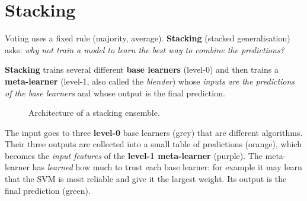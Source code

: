 \section{Stacking}

Voting uses a fixed rule (majority, average). \textbf{Stacking} (stacked generalisation) asks: \emph{why not train a model to learn the best way to combine the predictions?}

\begin{definition}[: Stacking]
\textbf{Stacking} trains several different \textbf{base learners} (level-0) and then trains a \textbf{meta-learner} (level-1, also called the \emph{blender}) whose \emph{inputs are the predictions of the base learners} and whose output is the final prediction.
\end{definition}

\begin{figure}[!htbp]
\centering
{}
\caption{Architecture of a stacking ensemble.}\label{fig:stack}
\end{figure}

\begin{explain}
The input goes to three \textbf{level-0} base learners (grey) that are different algorithms. Their three outputs are collected into a small table of predictions (orange), which becomes the \emph{input features} of the \textbf{level-1 meta-learner} (purple). The meta-learner has \emph{learned} how much to trust each base learner: for example it may learn that the SVM is most reliable and give it the largest weight. Its output is the final prediction (green).
\end{explain}

